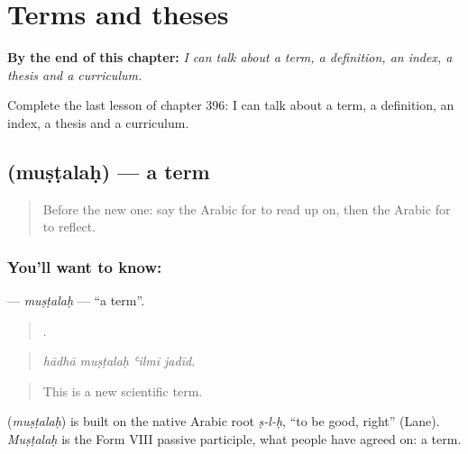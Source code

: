 
\chapter{Terms and theses}
\label{ch:ar-terms-and-theses}

\begin{chapteropening}
\textbf{By the end of this chapter:} \emph{I can talk about a term, a definition, an index, a thesis and a curriculum.}

Complete the last lesson of chapter 396: I can talk about a term, a definition, an index, a thesis and a curriculum.
\end{chapteropening}

\section[\texorpdfstring{\ar{مصطلح} (muṣṭalaḥ)}{مصطلح (muṣṭalaḥ)}]{ (muṣṭalaḥ) — a term}

\label{lesson:AR-C396-mustalah}



\begin{quote}
Before the new one: say the Arabic for to read up on, then the Arabic for to reflect.
\end{quote}

\subsection*{You'll want to know: }
\textbf{} — \emph{muṣṭalaḥ} — \textquotedblleft{}a term\textquotedblright{}.

\begin{quote}
   .
\end{quote}

\begin{quote}
\emph{hādhā muṣṭalaḥ ʿilmī jadīd.}
\end{quote}

\begin{quote}
This is a new scientific term.
\end{quote}

\begin{cousinweb}
\textbf{} (\emph{muṣṭalaḥ}) is built on the native Arabic root \emph{ṣ-l-ḥ}, \textquotedblleft{}to be good, right\textquotedblright{} (Lane). \emph{Muṣṭalaḥ} is the Form VIII passive participle, what people have agreed on: a term.
\end{cousinweb}

